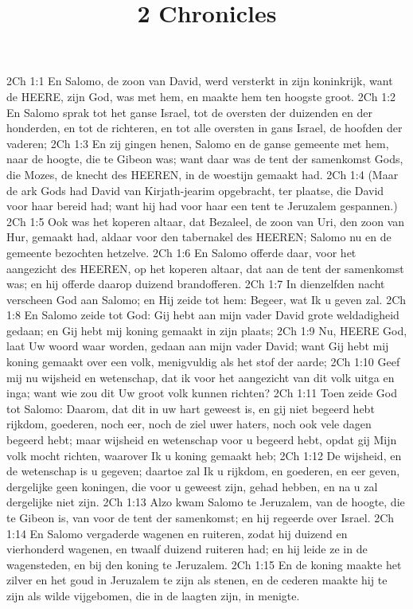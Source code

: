 

\title{2 Chronicles}


2Ch 1:1  En Salomo, de zoon van David, werd versterkt in zijn koninkrijk, want de HEERE, zijn God, was met hem, en maakte hem ten hoogste groot.
2Ch 1:2  En Salomo sprak tot het ganse Israel, tot de oversten der duizenden en der honderden, en tot de richteren, en tot alle oversten in gans Israel, de hoofden der vaderen;
2Ch 1:3  En zij gingen henen, Salomo en de ganse gemeente met hem, naar de hoogte, die te Gibeon was; want daar was de tent der samenkomst Gods, die Mozes, de knecht des HEEREN, in de woestijn gemaakt had.
2Ch 1:4  (Maar de ark Gods had David van Kirjath-jearim opgebracht, ter plaatse, die David voor haar bereid had; want hij had voor haar een tent te Jeruzalem gespannen.)
2Ch 1:5  Ook was het koperen altaar, dat Bezaleel, de zoon van Uri, den zoon van Hur, gemaakt had, aldaar voor den tabernakel des HEEREN; Salomo nu en de gemeente bezochten hetzelve.
2Ch 1:6  En Salomo offerde daar, voor het aangezicht des HEEREN, op het koperen altaar, dat aan de tent der samenkomst was; en hij offerde daarop duizend brandofferen.
2Ch 1:7  In dienzelfden nacht verscheen God aan Salomo; en Hij zeide tot hem: Begeer, wat Ik u geven zal.
2Ch 1:8  En Salomo zeide tot God: Gij hebt aan mijn vader David grote weldadigheid gedaan; en Gij hebt mij koning gemaakt in zijn plaats;
2Ch 1:9  Nu, HEERE God, laat Uw woord waar worden, gedaan aan mijn vader David; want Gij hebt mij koning gemaakt over een volk, menigvuldig als het stof der aarde;
2Ch 1:10  Geef mij nu wijsheid en wetenschap, dat ik voor het aangezicht van dit volk uitga en inga; want wie zou dit Uw groot volk kunnen richten?
2Ch 1:11  Toen zeide God tot Salomo: Daarom, dat dit in uw hart geweest is, en gij niet begeerd hebt rijkdom, goederen, noch eer, noch de ziel uwer haters, noch ook vele dagen begeerd hebt; maar wijsheid en wetenschap voor u begeerd hebt, opdat gij Mijn volk mocht richten, waarover Ik u koning gemaakt heb;
2Ch 1:12  De wijsheid, en de wetenschap is u gegeven; daartoe zal Ik u rijkdom, en goederen, en eer geven, dergelijke geen koningen, die voor u geweest zijn, gehad hebben, en na u zal dergelijke niet zijn.
2Ch 1:13  Alzo kwam Salomo te Jeruzalem, van de hoogte, die te Gibeon is, van voor de tent der samenkomst; en hij regeerde over Israel.
2Ch 1:14  En Salomo vergaderde wagenen en ruiteren, zodat hij duizend en vierhonderd wagenen, en twaalf duizend ruiteren had; en hij leide ze in de wagensteden, en bij den koning te Jeruzalem.
2Ch 1:15  En de koning maakte het zilver en het goud in Jeruzalem te zijn als stenen, en de cederen maakte hij te zijn als wilde vijgebomen, die in de laagten zijn, in menigte.
